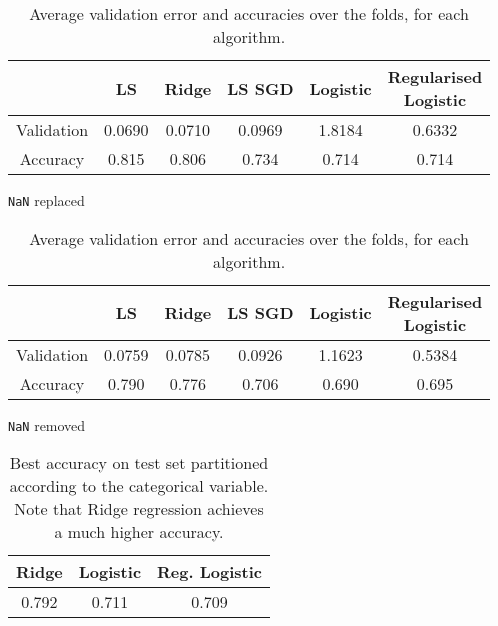 \documentclass[10pt,conference,compsocconf]{IEEEtran}
\begin{document}
\begin{table}[h]
    \begin{subtable}[h]{0.45\textwidth}
        \centering
        \begin{tabular}{ |c|c|c|c|c|c| } 
            \hline
             & LS & Ridge & LS SGD & Logistic & \makecell{Regularised  \\ Logistic } \\
            \hline
            Validation & 0.0690 & 0.0710 & 0.0969 & 1.8184 & 0.6332 \\
            Accuracy   & 0.815 & 0.806 & 0.734 & 0.714 & 0.714 \\
            \hline
        \end{tabular}
        \caption{\texttt{NaN} replaced}
        \label{tbl:nan-replaced}
    \end{subtable}
    \hfill
    \begin{subtable}[h]{0.45\textwidth}
        \centering
            \begin{tabular}{ |c|c|c|c|c|c| } 
                \hline
                 & LS & Ridge & LS SGD & Logistic & \makecell{Regularised  \\ Logistic } \\
                \hline
                Validation & 0.0759 & 0.0785 & 0.0926 & 1.1623 & 0.5384 \\
                Accuracy   & 0.790 & 0.776 & 0.706 & 0.690 & 0.695 \\
                \hline
            \end{tabular}
        \caption{\texttt{NaN} removed}
        \label{tbl:nan-removed}
    \end{subtable}
    \caption{Average validation error and accuracies over the folds, for each algorithm.}
    \label{tbl:val-and-acc}
\end{table}





\begin{table}
  \centering
  \begin{tabular}{ |c|c|c| } 
    \hline
    Ridge & Logistic & Reg. Logistic \\
    \hline
    0.792 & 0.711    & 0.709 \\
    \hline
  \end{tabular}
  \caption{Best accuracy on test set partitioned according to the categorical variable. Note that Ridge regression achieves a much higher accuracy.}
  \label{tbl:test-accuracies-partitioned}
\end{table}
\end{document}
